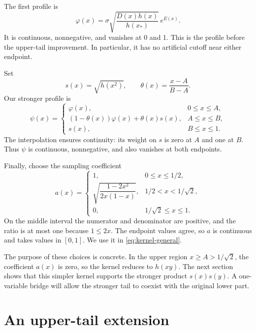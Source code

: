 \documentclass[11pt]{article}
\theoremstyle{remark}
\begin{document}
The first profile is
\begin{equation}\label{eq:phi}
\varphi(x)=\sigma\sqrt{\frac{D(x)h(x)}{h(x_*)}}\,e^{E(x)}.
\end{equation}
It is continuous, nonnegative, and vanishes at 0 and 1.
This is the profile before the upper-tail improvement. In particular,
it has no artificial cutoff near either endpoint.

Set
\begin{equation}\label{eq:s}
s(x)=\sqrt{h(x^2)},\qquad
\theta(x)=\frac{x-A}{B-A}.
\end{equation}
Our stronger profile is
\begin{equation}\label{eq:psi}
\psi(x)=
\begin{cases}
\varphi(x),&0\le x\le A,\\
(1-\theta(x))\varphi(x)+\theta(x)s(x),&A\le x\le B,\\
s(x),&B\le x\le1.
\end{cases}
\end{equation}
The interpolation ensures continuity: its weight on \(s\) is zero
at \(A\) and one at \(B\). Thus \(\psi\) is continuous, nonnegative,
and also vanishes at both endpoints.

Finally, choose the sampling coefficient
\begin{equation}\label{eq:a}
a(x)=
\begin{cases}
1,&0\le x\le1/2,\\
\sqrt{\dfrac{1-2x^2}{2x(1-x)}},&1/2<x<1/\sqrt2,\\
0,&1/\sqrt2\le x\le1.
\end{cases}
\end{equation}
On the middle interval the numerator and denominator are positive,
and the ratio is at most one because \(1\le2x\).
The endpoint values agree, so \(a\) is continuous and takes values
in \([0,1]\). We use it in \eqref{eq:kernel-general}.

The purpose of these choices is concrete. In the upper region
\(x\ge A>1/\sqrt2\), the coefficient \(a(x)\) is zero, so the kernel
reduces to \(h(xy)\). The next section shows that this simpler kernel
supports the stronger product \(s(x)s(y)\). A one-variable bridge
will allow the stronger tail to coexist with the original lower part.


\section{An upper-tail extension}\label{sec:tail}
\end{document}
